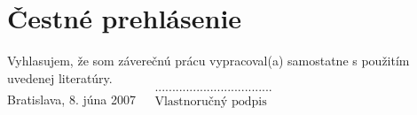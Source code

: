 \null
\vfill
\noindent
\section*{Čestné prehlásenie}

Vyhlasujem, že som záverečnú prácu vypracoval(a) samostatne s použitím uvedenej literatúry.\\

\noindent Bratislava, 8. júna 2007 \hfill $\begin{array}{rl}
                                          &\text{..................................}\\
                                          &\text{Vlastnoručný podpis}\\
                                           \end{array}$
\cleardoublepage 


	
